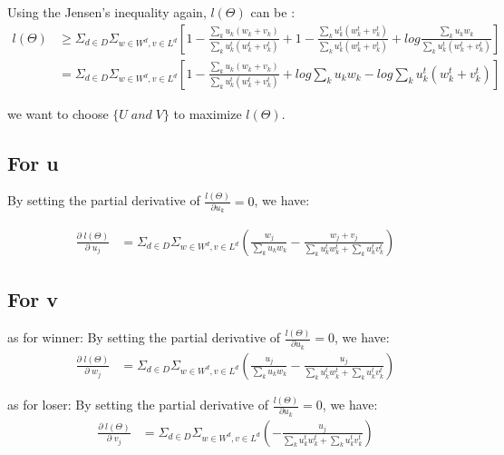 \documentclass{article}
\begin{document}
Using the Jensen's inequality again, $l(\Theta)$ can be :
\begin{align}
l(\Theta)
& \geq \Sigma_{d \in D} \Sigma_{w\in W^d, v\in L^d} [1- \frac{\sum_k u_k(w_k+v_k)}{\sum_k u_k^t(w_k^t +v_k^t)}+ 1-\frac{\sum_k u_k^t(w_k^t +v_k^t)}{\sum_k u_k^t(w_k^t +v_k^t)} +log \frac{\sum_k u_k w_k}{\sum_k u_k^t (w_k^t+v_k^t)}]\\
& =\Sigma_{d \in D} \Sigma_{w\in W^d, v\in L^d} [1- \frac{\sum_k u_k(w_k+v_k)}{\sum_k u_k^t(w_k^t +v_k^t)}+ log \sum_k u_k w_k -log \sum_k u_k^t (w_k^t+v_k^t)]
\end{align}

 we want to choose $\{ U \; and \; V\}$ to maximize $ l(\Theta). $ 


\subsection{For u}
By setting the partial derivative of $\frac{l(\Theta)}{\partial u_k}=0$, we have:

\begin{align}
\frac{\partial \;l(\Theta) }{\partial \;u_j}
 &= \Sigma_{d \in D} \Sigma_{w\in W^d, v\in L^d}(\frac{w_j}{\sum_k u_k w_k}-\frac{w_j+v_j}{\sum_k u_k^t w_k^t + \sum_k u_k^t v_k^t})
\end{align}

\subsection{For v}

as for winner:
By setting the partial derivative of $\frac{l(\Theta)}{\partial u_k}=0$, we have:
\begin{align}
\frac{\partial \;l(\Theta)}{\partial \;w_j}
&=  \Sigma_{d \in D} \Sigma_{w\in W^d, v\in L^d}(\frac{u_j}{\sum_k u_k w_k}-\frac{u_j}{\sum_k u_k^t w_k^t + \sum_k u_k^t v_k^t})
\end{align}

as for loser:
By setting the partial derivative of $\frac{l(\Theta)}{\partial u_k}=0$, we have:
\begin{align}
\frac{\partial \;l(\Theta)}{\partial \;v_j}
&=  \Sigma_{d \in D} \Sigma_{w\in W^d, v\in L^d}(-\frac{u_j}{\sum_k u_k^t w_k^t + \sum_k u_k^t v_k^t})
\end{align}
\end{document}
